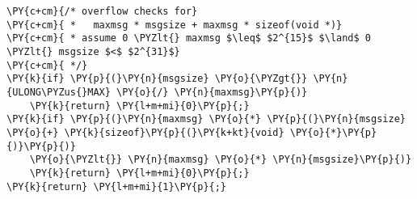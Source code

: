 \begin{Verbatim}[commandchars=\\\{\},codes={\catcode`\$=3\catcode`\^=7\catcode`\_=8}]
\PY{c+cm}{/* overflow checks for}
\PY{c+cm}{ *   maxmsg * msgsize + maxmsg * sizeof(void *)}
\PY{c+cm}{ * assume 0 \PYZlt{} maxmsg $\leq$ $2^{15}$ $\land$ 0 \PYZlt{} msgsize $<$ $2^{31}$}
\PY{c+cm}{ */}
\PY{k}{if} \PY{p}{(}\PY{n}{msgsize} \PY{o}{\PYZgt{}} \PY{n}{ULONG\PYZus{}MAX} \PY{o}{/} \PY{n}{maxmsg}\PY{p}{)}
    \PY{k}{return} \PY{l+m+mi}{0}\PY{p}{;}
\PY{k}{if} \PY{p}{(}\PY{n}{maxmsg} \PY{o}{*} \PY{p}{(}\PY{n}{msgsize} \PY{o}{+} \PY{k}{sizeof}\PY{p}{(}\PY{k+kt}{void} \PY{o}{*}\PY{p}{)}\PY{p}{)}
    \PY{o}{\PYZlt{}} \PY{n}{maxmsg} \PY{o}{*} \PY{n}{msgsize}\PY{p}{)}
    \PY{k}{return} \PY{l+m+mi}{0}\PY{p}{;}
\PY{k}{return} \PY{l+m+mi}{1}\PY{p}{;}
\end{Verbatim}
